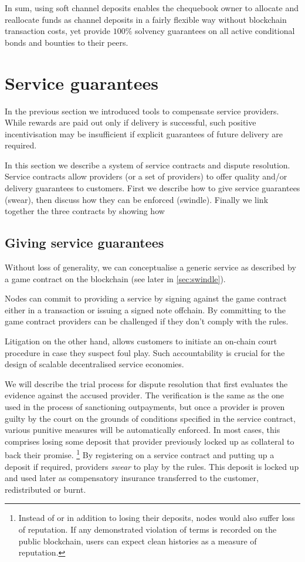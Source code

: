 \documentclass[a4paper,10pt]{article}
\begin{document}
In sum, using soft channel deposits enables the chequebook owner to allocate and reallocate funds
as channel deposits in a fairly flexible way without blockchain transaction costs,
yet provide $100\%$ solvency guarantees on all active conditional bonds and bounties to their peers.


\section{Service guarantees}
\label{sec:courtroom}

In the previous section we introduced tools to compensate service providers.
While rewards are paid out only if delivery is successful,
such positive incentivisation may be insufficient if
explicit guarantees of future delivery are required.

In this section we describe a system of service contracts and dispute resolution.
Service contracts allow providers (or a set of providers)
to offer quality and/or delivery guarantees to customers.
First we describe how to give service guarantees (swear), then discuss how they can be enforced (swindle).
Finally we link together the three contracts by showing how 


\subsection{Giving service guarantees}

Without loss of generality, we can conceptualise a generic service as described by a game contract
on the blockchain (see later in \ref{sec:swindle}).


Nodes can commit to providing a service by signing against the game contract
either in a transaction or issuing a signed note offchain.
By committing to the game contract  providers can be challenged if they don't comply with the rules.

Litigation on the other hand, allows customers to initiate an on-chain court procedure
in case they suspect foul play. Such accountability is
crucial for the design of scalable decentralised service economies.

We will describe the trial process for dispute
resolution that first evaluates the evidence against the accused provider.
The verification is the same as the one used in the process of sanctioning outpayments,
but once a provider is proven guilty by the court on the grounds of
conditions specified in the service contract, various punitive measures will be
automatically enforced. In most cases, this comprises losing some deposit that
provider previously locked up as collateral to back their promise.%
%
\footnote{Instead of or in addition to losing their deposits, nodes would also
suffer loss of reputation. If any demonstrated violation of terms is
recorded on the public blockchain, users can expect clean histories as a measure
of reputation.}
%
By registering on a service contract and putting up a deposit if required, providers
\emph{swear} to play by the rules.
This deposit is locked up and used later as compensatory insurance transferred to the
customer, redistributed or burnt.
\end{document}
